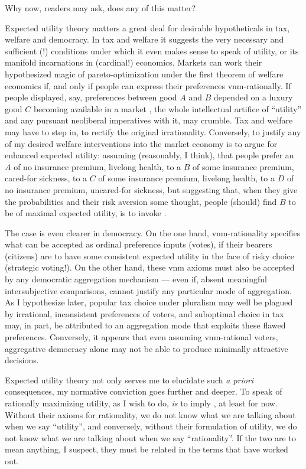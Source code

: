 Why now, readers may ask, does any of this matter?

Expected utility theory matters a great deal for desirable hypotheticals in tax, welfare and democracy.
In tax and welfare it suggests the very necessary and sufficient (!) conditions under which it even makes sense to speak of utility, or its manifold incarnations in (cardinal!) economics.
Markets can work their hypothesized magic of pareto-optimization under the first theorem of welfare economics if, and only if people can express their preferences \gls{vnm}-rationally.
If people displayed, say, preferences between good $A$ and $B$ depended on a luxury good $C$ becoming available in a market \citep{Frank2010a}, the whole intellectual artifice of ``utility'' and any pursuant neoliberal imperatives with it, may crumble.
Tax and welfare may have to step in, to rectify the original irrationality.
Conversely, to justify any of my desired welfare interventions into the market economy is to argue for enhanced expected utility:
assuming (reasonably, I think), that people prefer an $A$ of no insurance premium, livelong health, to a $B$ of some insurance premium, cared-for sickness, to a $C$ of some insurance premium, livelong health, to a $D$ of no insurance premium, uncared-for sickness, but suggesting that, when they give the probabilities and their risk aversion some thought, people (should) find $B$ to be of maximal expected utility, is to invoke \citeauthor{VonNeumannMorgenstern1944}.

The case is even clearer in democracy.
On the one hand, \gls{vnm}-rationality specifies what can be accepted as ordinal preference inputs (votes), if their bearers (citizens) are to have some consistent expected utility in the face of risky choice (strategic voting!).
On the other hand, these \gls{vnm} axioms must also be accepted by any democratic aggregation mechanism --- even if, absent meaningful intersubjective comparisons, \citeauthor{VonNeumannMorgenstern1944} cannot justify any particular mode of aggregation.
As I hypothesize later, popular tax choice under pluralism may well be plagued by irrational, inconsistent preferences of voters, and suboptimal choice in tax may, in part, be attributed to an aggregation mode that exploits these flawed preferences.
Conversely, it appears that even assuming \gls{vnm}-rational voters, aggregative democracy alone may not be able to produce minimally attractive decisions.

Expected utility theory not only serves me to elucidate such \emph{a priori} consequences, my normative conviction goes further and deeper.
To speak of rationally maximizing utility, as I wish to do, \emph{is} to imply \citeauthor{VonNeumannMorgenstern1944}, at least for now.
Without their axioms for rationality, we do not know what we are talking about when we say ``utility'', and conversely, without their formulation of utility, we do not know what we are talking about when we say ``rationality''.
If the two are to mean anything, I suspect, they must be related in the terms that \citeauthor{VonNeumannMorgenstern1944} have worked out.

